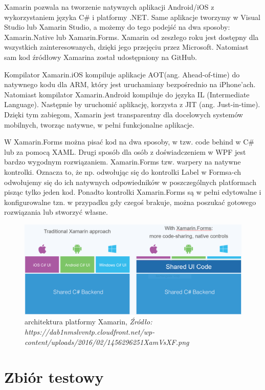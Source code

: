 \documentclass[brudnopis]{xmgr}
\begin{document}
Xamarin\cite{15} pozwala na tworzenie natywnych aplikacji Android/iOS z wykorzystaniem języka C\# i platformy .NET. Same aplikacje tworzymy w Visual Studio lub Xamarin Studio, a możemy do tego podejść na dwa sposoby: Xamarin.Native lub Xamarin.Forms. Xamarin od zeszłego roku jest dostępny dla wszystkich zainteresowanych, dzięki jego przejęciu przez Microsoft. Natomiast sam kod źródłowy Xamarina został udostępniony na GitHub.

Kompilator Xamarin.iOS kompiluje aplikacje AOT(ang. Ahead-of-time)  do natywnego kodu dla ARM, który jest uruchamiany bezpośrednio na iPhone’ach. Natomiast kompilator Xamarin.Android kompiluje do języka IL (Intermediate Language). Następnie by uruchomić aplikację, korzysta z JIT (ang. Just-in-time). Dzięki tym zabiegom, Xamarin jest transparentny dla docelowych systemów mobilnych, tworząc natywne, w pełni funkcjonalne aplikacje.

W Xamarin.Forms\cite{6} można pisać kod na dwa sposoby, w tzw. code behind w C\# lub za pomocą XAML. Drugi sposób dla osób z doświadczeniem w WPF jest bardzo wygodnym rozwiązaniem. Xamarin.Forms tzw. warpery na natywne kontrolki. Oznacza to, że np. odwołując się do kontrolki Label w Formsa-ch odwołujemy się do ich natywnych odpowiedników w poszczególnych platformach pisząc tylko jeden kod. Ponadto kontrolki Xamarin.Forms są w pełni edytowalne i konfigurowalne tzn. w przypadku gdy czegoś brakuje, można poszukać gotowego rozwiązania lub stworzyć własne.

\begin{figure}[!tbh]
\centering
\includegraphics[width=1\hsize]{fig/xamarin}
\caption{architektura platformy Xamarin, \emph{Źródło: https://dab1nmslvvntp.cloudfront.net/wp-content/uploads/2016/02/1456296251XamVsXF.png}}
\end{figure}
\newpage

\section{Zbiór testowy}
\end{document}
